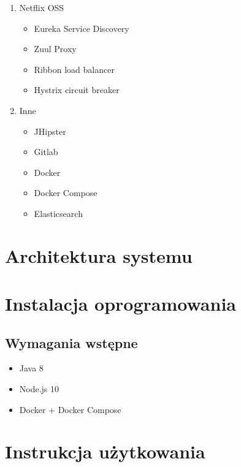\begin{enumerate}
    \item Netflix OSS \cite{tech:netflix-oss}
    \begin{itemize}
        \item Eureka Service Discovery \cite{tech:netflix-eureka}
        \item Zuul Proxy \cite{tech:netflix-zuul}
        \item Ribbon load balancer \cite{tech:netflix-ribbon}
        \item Hystrix circuit breaker \cite{tech:netflix-hystrix}
    \end{itemize}
    \item Inne
    \begin{itemize}
        \item JHipster \cite{tech:jhipster}
        \item Gitlab \cite{tech:gitlab}
        \item Docker \cite{tech:docker}
        \item Docker Compose \cite{tech:docker-compose}
        \item Elasticsearch \cite{tech:elasticsearch}
    \end{itemize}
\end{enumerate}
\section{Architektura systemu}
\section{Instalacja oprogramowania}
\subsection{Wymagania wstępne}
\begin{itemize}
    \item Java 8 \cite{tech:java}
    \item Node.js 10 \cite{tech:nodejs}
    \item Docker \cite{tech:docker} + Docker Compose \cite{tech:docker-compose}
\end{itemize}
\section{Instrukcja użytkowania}
\thispagestyle{normal}
